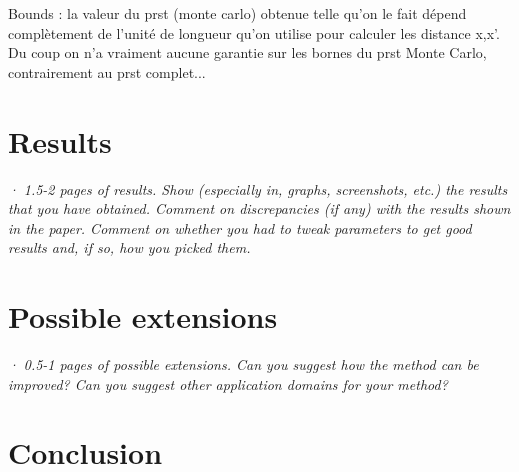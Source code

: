\documentclass[10pt,a4paper]{article}			%
\begin{document}
  	Bounds : la valeur du prst (monte carlo) obtenue telle qu'on le fait dépend complètement de l'unité de longueur qu'on utilise pour calculer les distance x,x'. Du coup on n'a vraiment aucune garantie sur les bornes du prst Monte Carlo, contrairement au prst complet...\\
  	
  	
  	\section{Results}
\textit{· 1.5-2 pages of results. Show (especially in, graphs, screenshots, etc.) the results that you have obtained. Comment on discrepancies (if any) with the results shown in the paper. Comment on whether you had to tweak parameters to get good results and, if so, how you picked them.\\}

	\section{Possible extensions}
	
\textit{· 0.5-1 pages of possible extensions. Can you suggest how the method can be improved? Can you suggest other application domains for your method?\\}

	\section*{Conclusion}

\nocite{*}


		
\end{document}
